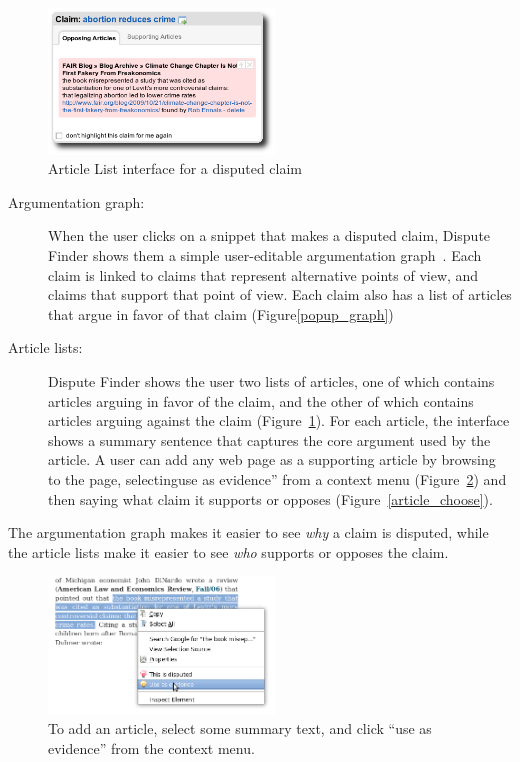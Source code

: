 \documentclass{www2010-submission}
\begin{document}
\begin{figure}[tb]
	\begin{center}
	\includegraphics[width=6cm]{pictures/popup_abortion_shadow.png}
	\caption{Article List interface for a disputed claim}
	\label{article_list}
	\end{center}
\end{figure}



\begin{description}
\item[Argumentation graph:] When the user clicks on a snippet that makes a disputed claim, Dispute Finder shows them a simple user-editable argumentation graph~\cite{Conklin1987a}. Each claim is linked to claims that represent alternative points of view, and claims that support that point of view. Each claim also has a list of articles that argue in favor of that claim (Figure\ref{popup_graph})

\item[Article lists:] Dispute Finder shows the user two lists of articles, one of which contains articles arguing in favor of the claim, and the other of which contains articles arguing against the claim (Figure~\ref{article_list}). For each article, the interface shows a summary sentence that captures the core argument used by the article. A user can add any web page as a supporting article by browsing to the page, selectinguse as evidence'' from a context menu (Figure~\ref{add_article}) and then saying what claim it supports or opposes (Figure~\ref{article_choose}).
\end{description}

The argumentation graph makes it easier to see {\it why} a claim is disputed, while the article lists make it easier to see {\it who} supports or opposes the claim. 

\begin{figure}[tb]
	\begin{center}
	\includegraphics[width=6cm]{pictures/mark_evidence.png}
	\caption{To add an article, select some summary text, and click ``use as evidence'' from the context menu.}
	\label{add_article}
	\end{center}
\end{figure}
\end{document}
